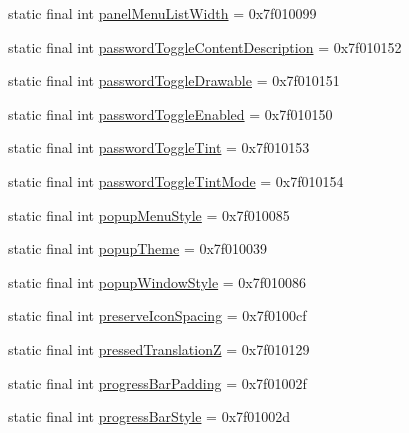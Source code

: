 \begin{CompactItemize}
\item 
static final int \hyperlink{classandroid_1_1support_1_1graphics_1_1drawable_1_1_r_1_1attr_e8ad23ea1fba316b03f59513e63ec2f7}{panelMenuListWidth} = 0x7f010099
\item 
static final int \hyperlink{classandroid_1_1support_1_1graphics_1_1drawable_1_1_r_1_1attr_68dc340a467fda0afb37cb9e864b20a1}{passwordToggleContentDescription} = 0x7f010152
\item 
static final int \hyperlink{classandroid_1_1support_1_1graphics_1_1drawable_1_1_r_1_1attr_aa727908e4939b20621d8b5d734d2642}{passwordToggleDrawable} = 0x7f010151
\item 
static final int \hyperlink{classandroid_1_1support_1_1graphics_1_1drawable_1_1_r_1_1attr_84bafe465948182cb862d1a0de3ac098}{passwordToggleEnabled} = 0x7f010150
\item 
static final int \hyperlink{classandroid_1_1support_1_1graphics_1_1drawable_1_1_r_1_1attr_d628199bf02a11fe9cfe57d414e3a826}{passwordToggleTint} = 0x7f010153
\item 
static final int \hyperlink{classandroid_1_1support_1_1graphics_1_1drawable_1_1_r_1_1attr_1188a12447e4d3cc83a7930a96d53554}{passwordToggleTintMode} = 0x7f010154
\item 
static final int \hyperlink{classandroid_1_1support_1_1graphics_1_1drawable_1_1_r_1_1attr_633eea01d2e98d7db9d3a52fa59bce32}{popupMenuStyle} = 0x7f010085
\item 
static final int \hyperlink{classandroid_1_1support_1_1graphics_1_1drawable_1_1_r_1_1attr_a944bcad00543e2919111d3f108dc897}{popupTheme} = 0x7f010039
\item 
static final int \hyperlink{classandroid_1_1support_1_1graphics_1_1drawable_1_1_r_1_1attr_ab8bbb72747706bd3db565003ffa925e}{popupWindowStyle} = 0x7f010086
\item 
static final int \hyperlink{classandroid_1_1support_1_1graphics_1_1drawable_1_1_r_1_1attr_682b521da50ec8e9ebaf1f9c98a16b8d}{preserveIconSpacing} = 0x7f0100cf
\item 
static final int \hyperlink{classandroid_1_1support_1_1graphics_1_1drawable_1_1_r_1_1attr_15cc0e32ca77c0ca66539c3c300967f9}{pressedTranslationZ} = 0x7f010129
\item 
static final int \hyperlink{classandroid_1_1support_1_1graphics_1_1drawable_1_1_r_1_1attr_ff7c80cbcd6c870b4043b9a404798b38}{progressBarPadding} = 0x7f01002f
\item 
static final int \hyperlink{classandroid_1_1support_1_1graphics_1_1drawable_1_1_r_1_1attr_d08f47ab98778ebae686213dc4ed3726}{progressBarStyle} = 0x7f01002d

\end{CompactItemize}
